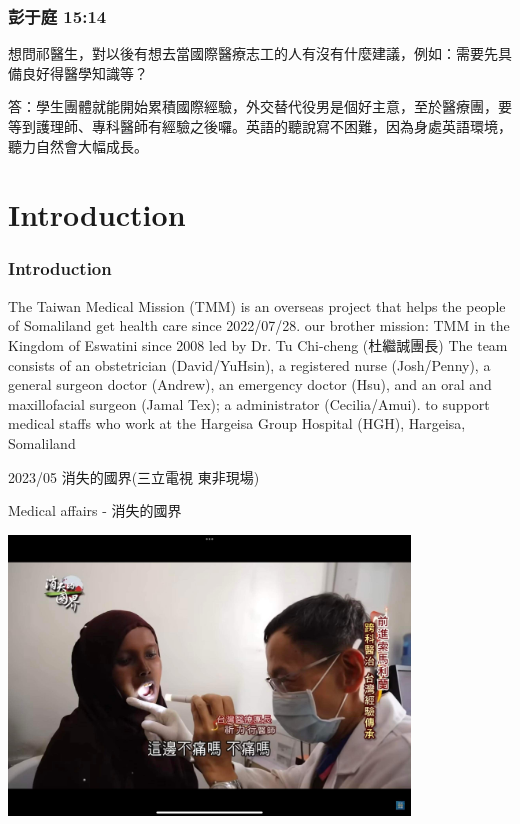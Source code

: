 \documentclass[aspectratio=169]{beamer}
\begin{document}
\begin{frame}
\frametitle{彭于庭 15:14}
想問祁醫生，對以後有想去當國際醫療志工的人有沒有什麼建議，例如：需要先具備良好得醫學知識等？

答：學生團體就能開始累積國際經驗，外交替代役男是個好主意，至於醫療團，要等到護理師、專科醫師有經驗之後囉。英語的聽說寫不困難，因為身處英語環境，聽力自然會大幅成長。
\end{frame}




\section{Introduction}
\begin{frame}
\frametitle{Introduction}
\begin{outline}
    

\1 The Taiwan Medical Mission (TMM) is an overseas project that helps the people of Somaliland get health care since 2022/07/28.
    \2 our brother mission: TMM in the Kingdom of Eswatini since 2008 led by Dr. Tu Chi-cheng (杜繼誠團長)
\1 The team consists of %
    \2 an obstetrician (David/YuHsin), a registered nurse (Josh/Penny), a general surgeon doctor (Andrew), an emergency doctor (Hsu), and an oral and maxillofacial surgeon (Jamal Tex); a administrator (Cecilia/Amui). 
    \2 to support medical staffs who work at the Hargeisa Group Hospital (HGH), Hargeisa, Somaliland



\end{outline}

2023/05 消失的國界(三立電視 東非現場)

\end{frame}


\begin{frame}{Medical affairs - 消失的國界}
    \begin{center}
        \includegraphics[width=0.8\textwidth]{IMG_4940(1).jpeg}

    \end{center}
\end{frame}
\end{document}
